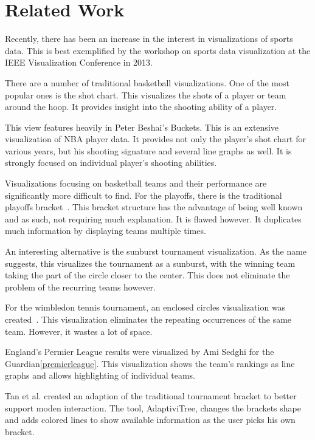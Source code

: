 \documentclass[chi_draft]{sigchi}
\begin{document}
\section{Related Work}\label{sec:literature}
Recently, there has been an increase in the interest in visualizations of sports
data. This is best exemplified by the workshop on sports data visualization at
the IEEE Visualization Conference in 2013\cite{ieeevis}. 

There are a number of traditional basketball visualizations. One of the most
popular ones is the shot chart. This visualizes the shots of a player or team
around the hoop. It provides insight into the shooting ability of a
player\cite{goldsberry,stephenchu}.

This view features heavily in Peter Beshai's Buckets\cite{peterbeshai}. This is
an extensive visualization of NBA player data. It provides not only the player's
shot chart for various years, but his shooting signature and several line graphs
as well. It is strongly focused on individual player's shooting abilities. 

Visualizations focusing on basketball teams and their performance are
significantly more difficult to find. For the playoffs, there is the traditional
playoffs bracket~\cite{tournamentladder}. This bracket structure has the
advantage of being well known and as such, not requiring much explanation. It is
flawed however. It duplicates much information by displaying teams multiple
times. 

An interesting alternative is the sunburst tournament
visualization\cite{sunburst}. As the name suggests, this visualizes the
tournament as a sunburst, with the winning team taking the part of the circle
closer to the center. This does not eliminate the problem of the recurring teams
however.

For the wimbledon tennis tournament, an enclosed circles visualization was
created~\cite{enclosedcircles}. This visualization eliminates the repeating
occurrences of the same team. However, it wastes a lot of space. 

England's Permier League results were visualized by Ami Sedghi for the
Guardian\ref{premierleague}. This visualization shows the team's rankings as
line graphs and allows highlighting of individual teams.

Tan et al. created an adaption of the traditional tournament bracket to better
support moden interaction\cite{adaptivitree}. The tool, AdaptiviTree, changes
the brackets shape and adds colored lines to show available information as the
user picks his own bracket.
\end{document}
